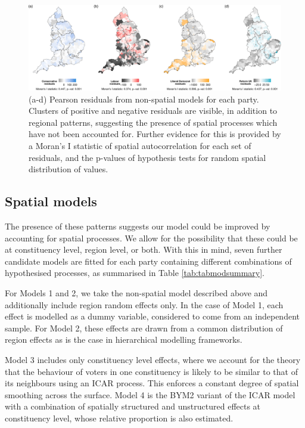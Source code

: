 \documentclass[webpdf,large,contemporary,namedate]{oup-authoring-template}
\theoremstyle{thmstyleone}
\theoremstyle{thmstyletwo}
\theoremstyle{thmstylethree}
\begin{document}
\begin{figure}[th]
\includegraphics[width=1\linewidth]{jrss_resubmission3_files/figure-latex/fignonspatial-1} \caption{(a-d) Pearson residuals from non-spatial models for each party. Clusters of positive and negative residuals are visible, in addition to regional patterns, suggesting the presence of spatial processes which have not been accounted for. Further evidence for this is provided by a Moran's I statistic of spatial autocorrelation for each set of residuals, and the p-values of hypothesis tests for random spatial distribution of values.}\label{fig:fignonspatial}
\end{figure}

\subsection{Spatial models}\label{spatial-models}

The presence of these patterns suggests our model could be improved by
accounting for spatial processes. We allow for the possibility that
these could be at constituency level, region level, or both. With this
in mind, seven further candidate models are fitted for each party
containing different combinations of hypothesised processes, as
summarised in Table \ref{tab:tabmodsummary}.

For Models 1 and 2, we take the non-spatial model described above and
additionally include region random effects only. In the case of Model 1,
each effect is modelled as a dummy variable, considered to come from an
independent sample. For Model 2, these effects are drawn from a common
distribution of region effects as is the case in hierarchical modelling
frameworks.

Model 3 includes only constituency level effects, where we account for
the theory that the behaviour of voters in one constituency is likely to
be similar to that of its neighbours using an ICAR process. This
enforces a constant degree of spatial smoothing across the surface.
Model 4 is the BYM2 variant of the ICAR model with a combination of
spatially structured and unstructured effects at constituency level,
whose relative proportion is also estimated.
\end{document}
